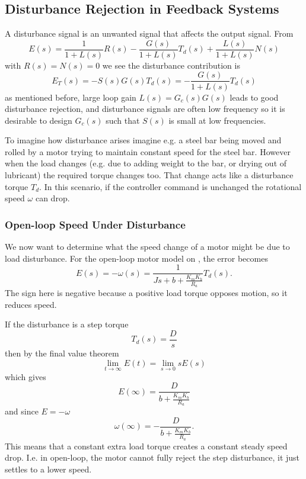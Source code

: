 \subsection{Disturbance Rejection in Feedback Systems}
A disturbance signal is an unwanted signal that affects the output signal.
From
\begin{equation*}
  E(s) = \frac{1}{1 + L(s)}R(s) - \frac{G(s)}{1 + L(s)}T_d(s) + \frac{L(s)}{1 + L(s)}N(s)
\end{equation*}
with $R(s) = N(s) = 0$ we see the disturbance contribution is
\begin{equation*}
  E_T(s) = - S(s) G(s) T_d(s) = - \frac{G(s)}{1 + L(s)}T_d(s)
\end{equation*}
as mentioned before, large loop gain $L(s) = G_c(s) G(s)$ leads to good disturbance rejection, and disturbance signals are often low frequency so it is desirable to design $G_c(s)$ such that $S(s)$ is small at low frequencies.

To imagine how disturbance arises imagine e.g. a steel bar being moved and rolled by a motor trying to maintain constant speed for the steel bar.
However when the load changes (e.g. due to adding weight to the bar, or drying out of lubricant) the required torque changes too.
That change acts like a disturbance torque $T_d$.
In this scenario, if the controller command is unchanged the rotational speed $\omega$ can drop.

\subsubsection{Open-loop Speed Under Disturbance}
We now want to determine what the speed change of a motor might be due to load disturbance.
For the open-loop motor model on , the error becomes
\begin{equation*}
  E(s) = - \omega(s) = \frac{1}{Js + b + \frac{K_m K_b}{R_a}} T_d(s)
.\end{equation*}
The sign here is negative because a positive load torque opposes motion, so it reduces speed.

If the disturbance is a step torque
\begin{equation*}
  T_d(s) = \frac{D}{s}
\end{equation*}
then by the final value theorem
\begin{equation*}
  \lim_{t \to \infty}E(t) = \lim_{s \to 0}s E(s)
\end{equation*}
which gives
\begin{equation*}
  E(\infty) = \frac{D}{b + \frac{K_m K_b}{R_a}}
\end{equation*}
and since $E = - \omega$
\begin{equation*}
  \omega(\infty) = - \frac{D}{b + \frac{K_m K_b}{R_a}}
.\end{equation*}
This means that a constant extra load torque creates a constant steady speed drop.
I.e. in open-loop, the motor cannot fully reject the step disturbance, it just settles to a lower speed.

